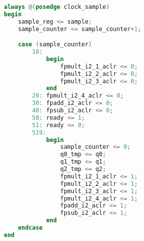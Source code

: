 \begin{lstlisting}[language=verilog,caption={Algorytm Goertzla -- obliczanie wyniku},label={lst:result}]
always @(posedge clock_sample)
begin
	sample_reg <= sample;
	sample_counter <= sample_counter+1;

	case (sample_counter)
		10:
			begin
				fpmult_i2_1_aclr <= 0;
				fpmult_i2_2_aclr <= 0;
				fpmult_i2_3_aclr <= 0;
 			end
		20:	fpmult_i2_4_aclr <= 0;
		30: fpadd_i2_aclr <= 0;
		40: fpsub_i2_aclr <= 0;
		50:	ready <= 1;
		51: ready <= 0;
		519:
			begin
				sample_counter <= 0;
				q0_tmp <= q0;
				q1_tmp <= q1;
				q2_tmp <= q2;
				fpmult_i2_1_aclr <= 1;
				fpmult_i2_2_aclr <= 1;
				fpmult_i2_3_aclr <= 1;
				fpmult_i2_4_aclr <= 1;
				fpadd_i2_aclr <= 1;
				fpsub_i2_aclr <= 1;
			end
	endcase
end
\end{lstlisting}
\vspace{10pt}

